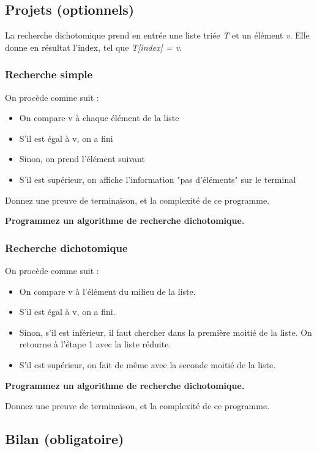 \subsection{Projets (optionnels)}


La recherche dichotomique prend en entrée une liste triée  \textit{T} et un élément \textit{v}.
Elle donne en résultat l'index, tel que \textit{T[index] = v}.
\subsubsection{Recherche simple}

On procède comme suit :
\begin{itemize}
    \item On compare v à chaque élément de la liste
    \item S’il est égal à v, on a fini
    \item Sinon, on prend l'élément suivant
    \item S’il est supérieur, on affiche l'information "pas d'éléments" sur le terminal
\end{itemize}

Donnez une preuve de terminaison, et la complexité de ce programme.


\textbf{Programmez un algorithme de recherche dichotomique.
}


\subsubsection{Recherche dichotomique}

On procède comme suit :
\begin{itemize}
    \item On compare v à l’élément du milieu de la liste.
    \item S’il est égal à v, on a fini.
    \item Sinon, s’il est inférieur, il faut chercher dans la première moitié de la liste. On retourne à l’étape 1 avec la liste réduite.
    \item S’il est supérieur, on fait de même avec la seconde moitié de la liste.
\end{itemize}

\textbf{Programmez un algorithme de recherche dichotomique.
}

Donnez une preuve de terminaison, et la complexité de ce programme.

\newpage

\subsection{Bilan (obligatoire)}



